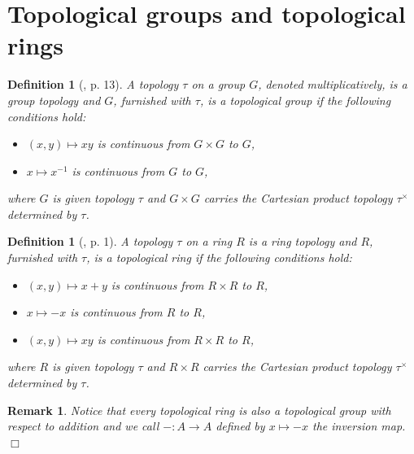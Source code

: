 \documentclass[12pt, oneside]{book}
\newtheorem{definition}[theorem]{Definition}
\newtheorem{remark}[theorem]{Remark}
\newcommand{\qed}{\hfill ~$\Box$\\}
\begin{document}
\section{Topological groups and topological rings}

\begin{definition}[\cite{W1}, p. 13] 
\normalfont
\noindent A topology $\tau$ on a group $G$, denoted multiplicatively, is a {\sl group topology} and $G$, furnished with $\tau$, is a {\sl topological group} if the following conditions hold:
\begin{itemize}
\item [TG1.] \quad $(x,y) \mapsto xy$ is continuous from $G \times G$ to $G$,
\item [TG2.] \quad  $x \mapsto x^{-1}$ is continuous from $G$ to $G$,
\end{itemize}
\noindent where $G$ is given topology $\tau$ and $G \times G$ carries the Cartesian product 
topology $\tau^{\times}$ determined by $\tau$.

\end{definition}


\begin{definition}[\cite{W1}, p. 1] \label{dfnTopRing}
\normalfont
\noindent A topology $\tau$ on a ring $R$ is a {\sl ring topology} and $R$, furnished with $\tau$, 
is a {\sl topological ring} if the following conditions hold:
\begin{itemize}
\item [TR1.] \quad  $(x,y) \mapsto x+y$ is continuous from $R \times R$ to $R$,
\item [TR2.] \quad  $x \mapsto -x$ is continuous from $R$ to $R$,
\item [TR3.] \quad  $(x,y) \mapsto xy$ is continuous from $R \times R$ to $R$,
\end{itemize}

\noindent where $R$ is given topology $\tau$ and $R \times R$ carries the Cartesian product 
topology $\tau^{\times}$ determined by $\tau$.

\end{definition}


\begin{remark}
\normalfont
\noindent Notice that every topological ring is also a topological group with respect to addition and 
we call $-: A \rightarrow A$ defined by $x \mapsto -x$ the inversion map.
\qed
\end{remark}
\end{document}
